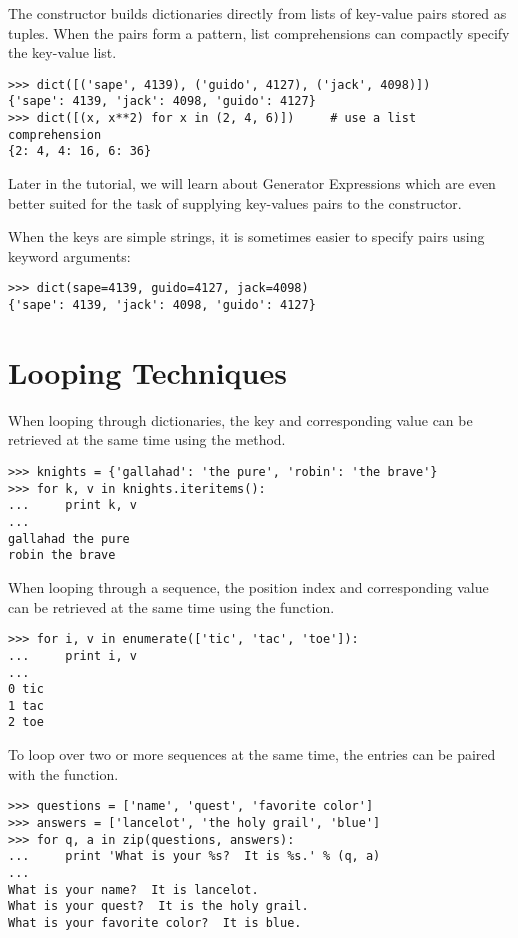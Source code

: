 \documentclass{manual}
\begin{document}
The  constructor builds dictionaries directly from
lists of key-value pairs stored as tuples.  When the pairs form a
pattern, list comprehensions can compactly specify the key-value list.

\begin{verbatim}
>>> dict([('sape', 4139), ('guido', 4127), ('jack', 4098)])
{'sape': 4139, 'jack': 4098, 'guido': 4127}
>>> dict([(x, x**2) for x in (2, 4, 6)])     # use a list comprehension
{2: 4, 4: 16, 6: 36}
\end{verbatim}

Later in the tutorial, we will learn about Generator Expressions
which are even better suited for the task of supplying key-values pairs to
the  constructor.

When the keys are simple strings, it is sometimes easier to specify
pairs using keyword arguments:

\begin{verbatim}
>>> dict(sape=4139, guido=4127, jack=4098)
{'sape': 4139, 'jack': 4098, 'guido': 4127}
\end{verbatim}


\section{Looping Techniques \label{loopidioms}}

When looping through dictionaries, the key and corresponding value can
be retrieved at the same time using the  method.

\begin{verbatim}
>>> knights = {'gallahad': 'the pure', 'robin': 'the brave'}
>>> for k, v in knights.iteritems():
...     print k, v
...
gallahad the pure
robin the brave
\end{verbatim}
 
When looping through a sequence, the position index and corresponding
value can be retrieved at the same time using the
 function.

\begin{verbatim} 
>>> for i, v in enumerate(['tic', 'tac', 'toe']):
...     print i, v
...
0 tic
1 tac
2 toe
\end{verbatim}

To loop over two or more sequences at the same time, the entries
can be paired with the  function.

\begin{verbatim}
>>> questions = ['name', 'quest', 'favorite color']
>>> answers = ['lancelot', 'the holy grail', 'blue']
>>> for q, a in zip(questions, answers):
...     print 'What is your %s?  It is %s.' % (q, a)
...	
What is your name?  It is lancelot.
What is your quest?  It is the holy grail.
What is your favorite color?  It is blue.
\end{verbatim}
\end{document}
